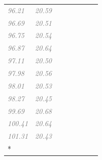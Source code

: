 \documentclass[
  letterpaper,
  DIV=11,
  numbers=noendperiod]{scrartcl}
\newcommand{\cmark}{\ding{51}}
\begin{document}
\begin{longtable}[t]{llccccll}
\textcolor{gray}{\em{96.21}} & \textcolor{gray}{\em{20.59}} & \textcolor{gray}{\em{}} & \textcolor{gray}{\em{}} & \textcolor{gray}{\em{\cmark}} & \textcolor{gray}{\em{}} & \textcolor{gray}{\em{}} & \textcolor{gray}{\em{}}\\
\textcolor{gray}{\em{96.69}} & \textcolor{gray}{\em{20.51}} & \textcolor{gray}{\em{\cmark}} & \textcolor{gray}{\em{}} & \textcolor{gray}{\em{}} & \textcolor{gray}{\em{}} & \textcolor{gray}{\em{}} & \textcolor{gray}{\em{}}\\
\addlinespace
\textcolor{gray}{\em{96.75}} & \textcolor{gray}{\em{20.54}} & \textcolor{gray}{\em{\cmark}} & \textcolor{gray}{\em{}} & \textcolor{gray}{\em{\cmark}} & \textcolor{gray}{\em{}} & \textcolor{gray}{\em{}} & \textcolor{gray}{\em{\cmark}}\\
\textcolor{gray}{\em{96.87}} & \textcolor{gray}{\em{20.64}} & \textcolor{gray}{\em{}} & \textcolor{gray}{\em{}} & \textcolor{gray}{\em{\cmark}} & \textcolor{gray}{\em{\cmark}} & \textcolor{gray}{\em{}} & \textcolor{gray}{\em{}}\\
\textcolor{gray}{\em{97.11}} & \textcolor{gray}{\em{20.50}} & \textcolor{gray}{\em{}} & \textcolor{gray}{\em{}} & \textcolor{gray}{\em{}} & \textcolor{gray}{\em{\cmark}} & \textcolor{gray}{\em{}} & \textcolor{gray}{\em{}}\\
\textcolor{gray}{\em{97.98}} & \textcolor{gray}{\em{20.56}} & \textcolor{gray}{\em{\cmark}} & \textcolor{gray}{\em{}} & \textcolor{gray}{\em{}} & \textcolor{gray}{\em{}} & \textcolor{gray}{\em{}} & \textcolor{gray}{\em{\cmark}}\\
\textcolor{gray}{\em{98.01}} & \textcolor{gray}{\em{20.53}} & \textcolor{gray}{\em{\cmark}} & \textcolor{gray}{\em{}} & \textcolor{gray}{\em{}} & \textcolor{gray}{\em{\cmark}} & \textcolor{gray}{\em{}} & \textcolor{gray}{\em{\cmark}}\\
\addlinespace
\textcolor{gray}{\em{98.27}} & \textcolor{gray}{\em{20.45}} & \textcolor{gray}{\em{\cmark}} & \textcolor{gray}{\em{}} & \textcolor{gray}{\em{}} & \textcolor{gray}{\em{\cmark}} & \textcolor{gray}{\em{}} & \textcolor{gray}{\em{}}\\
\textcolor{gray}{\em{99.69}} & \textcolor{gray}{\em{20.68}} & \textcolor{gray}{\em{\cmark}} & \textcolor{gray}{\em{}} & \textcolor{gray}{\em{\cmark}} & \textcolor{gray}{\em{\cmark}} & \textcolor{gray}{\em{}} & \textcolor{gray}{\em{\cmark}}\\
\textcolor{gray}{\em{100.41}} & \textcolor{gray}{\em{20.64}} & \textcolor{gray}{\em{}} & \textcolor{gray}{\em{}} & \textcolor{gray}{\em{}} & \textcolor{gray}{\em{\cmark}} & \textcolor{gray}{\em{}} & \textcolor{gray}{\em{\cmark}}\\
\textcolor{gray}{\em{101.31}} & \textcolor{gray}{\em{20.43}} & \textcolor{gray}{\em{}} & \textcolor{gray}{\em{}} & \textcolor{gray}{\em{}} & \textcolor{gray}{\em{}} & \textcolor{gray}{\em{}} & \textcolor{gray}{\em{\cmark}}\\*

\end{longtable}
\end{document}
